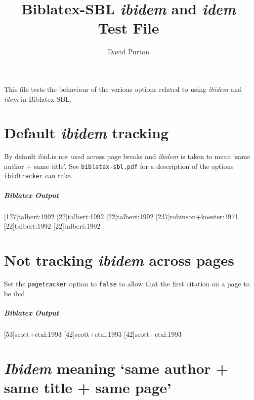 \documentclass{article}
\newenvironment{biboutput}{%
  \subparagraph{Biblatex Output}
}{\color{black}}
\begin{document}
\title{Biblatex-SBL \emph{ibidem} and \emph{idem} Test File}
\author{David Purton}
\maketitle

This file tests the behaviour of the various options related to using
\emph{ibidem} and \emph{idem} in Biblatex-SBL.

\section*{Default \emph{ibidem} tracking}

By default ibid.\@ is not used across page breaks and \emph{ibidem} is taken
to mean ‘same author + same title’. See \texttt{biblatex-sbl.pdf} for a
description of the options \texttt{ibidtracker} can take.

\begin{biboutput}
  [127]{talbert:1992}
  [22]{talbert:1992}
  [22]{talbert:1992}
  [237]{robinson+koester:1971}
  [22]{talbert:1992}
  \clearpage
  [22]{talbert:1992}
\end{biboutput}

\section*{Not tracking \emph{ibidem} across pages}


Set the \texttt{pagetracker} option to \texttt{false} to allow that the first
citation on a page to be ibid. 


\begin{biboutput}
  [53]{scott+etal:1993}
  [42]{scott+etal:1993}
  \clearpage
  [42]{scott+etal:1993}
\end{biboutput}

\section*{\emph{Ibidem} meaning ‘same author + same title + same page’}
\end{document}
